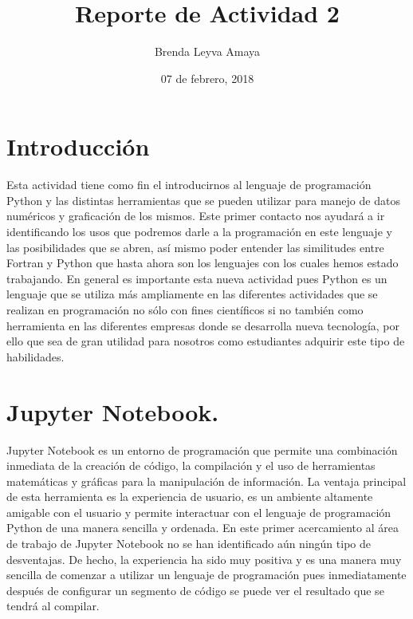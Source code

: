 \documentclass{article} %
\title{Reporte de Actividad 2}
\author{Brenda Leyva Amaya}
\date{07 de febrero, 2018}
\begin{document}
\maketitle %


\section{Introducción}

	Esta actividad tiene como fin el introducirnos al lenguaje de programación Python y las distintas herramientas que se pueden utilizar para manejo de datos numéricos y graficación de los mismos. Este primer contacto nos ayudará a ir identificando los usos que podremos darle a la programación en este lenguaje y las posibilidades que se abren, así mismo poder entender las similitudes entre Fortran y Python que hasta ahora son los lenguajes con los cuales hemos estado trabajando. 
\vspace{0.5 cm}
En general es importante esta nueva actividad pues Python es un lenguaje que se utiliza más ampliamente en las diferentes actividades que se realizan en programación no sólo con fines científicos si no también como herramienta en las diferentes empresas donde se desarrolla nueva tecnología, por ello que sea de gran utilidad para nosotros como estudiantes adquirir este tipo de habilidades. 

\section{Jupyter Notebook.}
Jupyter Notebook es un entorno de programación que permite una combinación inmediata de la creación de código, la compilación y el uso de herramientas matemáticas y gráficas para la manipulación de información. 
\vspace{0.5 cm}
La ventaja principal de esta herramienta es la experiencia de usuario, es un ambiente altamente amigable con el usuario y permite interactuar con el lenguaje de programación Python de una manera sencilla y ordenada. 
\vspace{0.5 cm}
En este primer acercamiento al área de trabajo de Jupyter Notebook no se han identificado aún ningún tipo de desventajas. De hecho, la experiencia ha sido muy positiva y es una manera muy sencilla de comenzar a utilizar un lenguaje de programación pues inmediatamente después de configurar un segmento de código se puede ver el resultado que se tendrá al compilar. 
\end{document}
